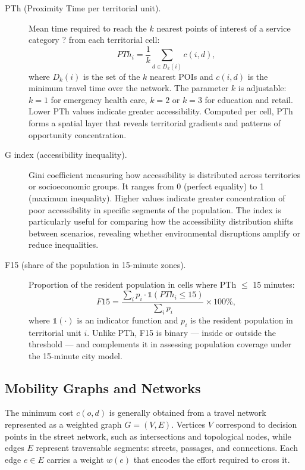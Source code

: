 \begin{description}
  \item[PTh (Proximity Time per territorial unit).] Mean time required to reach the $k$ nearest points of interest of a service category ? from each territorial cell:
\begin{equation}
    PTh_i = \frac{1}{k} \sum_{d \in D_k(i)} c(i,d),
\end{equation}
\noindent where $D_k(i)$ is the set of the $k$ nearest POIs and $c(i,d)$ is the minimum travel time over the network. The parameter $k$ is adjustable: $k=1$ for emergency health care, $k=2$ or $k=3$ for education and retail. Lower PTh values indicate greater accessibility. Computed per cell, PTh forms a spatial layer that reveals territorial gradients and patterns of opportunity concentration.

  \item[G index (accessibility inequality).] Gini coefficient measuring how accessibility is distributed across territories or socioeconomic groups. It ranges from 0 (perfect equality) to 1 (maximum inequality). Higher values indicate greater concentration of poor accessibility in specific segments of the population. The index is particularly useful for comparing how the accessibility distribution shifts between scenarios, revealing whether environmental disruptions amplify or reduce inequalities.

  \item[F15 (share of the population in 15-minute zones).] Proportion of the resident population in cells where PTh $\leq$ 15 minutes:
\begin{equation}
    F15 = \frac{\sum_i p_i \cdot \mathbb{1}(PTh_i \leq 15)}{\sum_i p_i} \times 100\%,
\end{equation}
\noindent where $\mathbb{1}(\cdot)$ is an indicator function and $p_i$ is the resident population in territorial unit $i$. Unlike PTh, F15 is binary — inside or outside the threshold — and complements it in assessing population coverage under the 15-minute city model.
\end{description}

\subsection{Mobility Graphs and Networks}

The minimum cost $c(o,d)$ is generally obtained from a travel network represented as a weighted graph $G=(V,E)$. Vertices $V$ correspond to decision points in the street network, such as intersections and topological nodes, while edges $E$ represent traversable segments: streets, passages, and connections. Each edge $e \in E$ carries a weight $w(e)$ that encodes the effort required to cross it.

